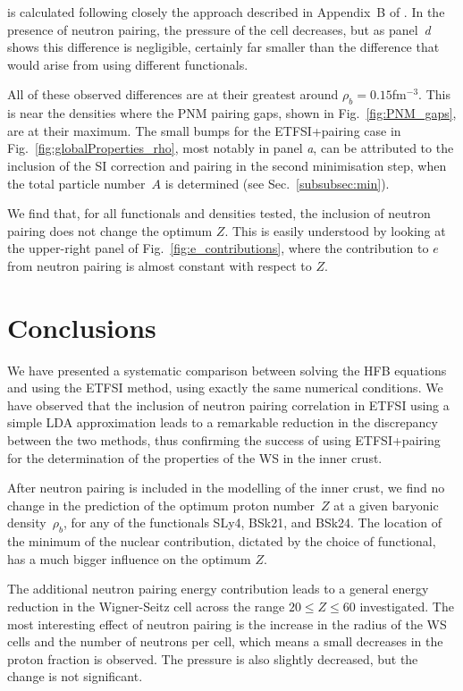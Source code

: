 \documentclass[
    amsmath,amssymb,
    aps,
    prc,
    floatfix,
]{revtex4-2}
\begin{document}
\noindent is calculated following closely the approach described in Appendix~B of \cite{pearsonInnerCrustNeutron2012}. In the presence of neutron pairing, the pressure of the cell decreases, but as panel~\emph{d} shows this difference is negligible, certainly far smaller than the difference that would arise from using different functionals.

All of these observed differences are at their greatest around $\rho_b=0.15$fm$^{-3}$. This is near the densities where the PNM pairing gaps, shown in Fig.~\ref{fig:PNM_gaps}, are at their maximum. The small bumps for the ETFSI+pairing case in Fig.~\ref{fig:globalProperties_rho}, most notably in panel \emph{a}, can be attributed to the inclusion of the SI correction and pairing in the second minimisation step, when the total particle number~$A$ is determined (see Sec.~\ref{subsubsec:min}).

We find that, for all functionals and densities tested, the inclusion of neutron pairing does not change the optimum $Z$. This is easily understood by looking at the upper-right panel of Fig.~\ref{fig:e_contributions}, where the contribution to $e$ from neutron pairing is almost constant with respect to $Z$.


\section{Conclusions}\label{sec:concl}

We have presented a systematic comparison between solving the HFB equations and using the ETFSI method, using exactly the same numerical conditions. We have observed that the inclusion of neutron pairing correlation in ETFSI using a simple LDA approximation leads to a remarkable reduction in the discrepancy between the two methods, thus confirming the success of using ETFSI+pairing for the determination of the properties of the WS in the inner crust.

After neutron pairing is included in the modelling of the inner crust, we find no change in the prediction of the optimum proton number~$Z$ at a given baryonic density~$\rho_b$, for any of the functionals SLy4, BSk21, and BSk24. The location of the minimum of the nuclear contribution, dictated by the choice of functional, has a much bigger influence on the optimum $Z$. 

The additional neutron pairing energy contribution leads to a general energy reduction in the Wigner-Seitz  cell across the range $20\leq Z\leq60$ investigated. The most interesting effect of neutron pairing is the increase in the radius of the WS cells and the number of neutrons per cell, which means a small decreases in the proton fraction is observed. The pressure is also slightly decreased, but the change is not significant.
\end{document}
